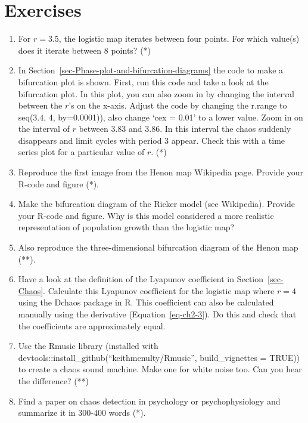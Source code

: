 \documentclass[
  a4paper,
  DIV=11,
  numbers=noendperiod,
  oneside]{scrreprt}
\begin{document}
\hypertarget{sec-Exercises}{%
\section{Exercises}\label{sec-Exercises}}

\begin{enumerate}
\def\labelenumi{\arabic{enumi})}
\item
  For \(r=3.5\), the logistic map iterates between four points. For
  which value(s) does it iterate between 8 points? (*)
\item
  In Section~\ref{sec-Phase-plot-and-bifurcation-diagrams} the code to
  make a bifurcation plot is shown. First, run this code and take a look
  at the bifurcation plot. In this plot, you can also zoom in by
  changing the interval between the \(r\)'s on the x-axis. Adjust the
  code by changing the r.range to seq(3.4, 4, by=0.0001)), also change
  `cex = 0.01' to a lower value. Zoom in on the interval of \(r\)
  between 3.83 and 3.86. In this interval the chaos suddenly disappears
  and limit cycles with period 3 appear. Check this with a time series
  plot for a particular value of \(r\). (*)
\item
  Reproduce the first image from the Henon map Wikipedia page. Provide
  your R-code and figure (*).
\item
  Make the bifurcation diagram of the Ricker model (see Wikipedia).
  Provide your R-code and figure. Why is this model considered a more
  realistic representation of population growth than the logistic map?
\item
  Also reproduce the three-dimensional bifurcation diagram of the Henon
  map (**).
\item
  Have a look at the definition of the Lyapunov coefficient in
  Section~\ref{sec-Chaos}. Calculate this Lyapunov coefficient for the
  logistic map where \(r = 4\) using the Dchaos package in R. This
  coefficient can also be calculated manually using the derivative
  (Equation~\ref{eq-ch2-3}). Do this and check that the coefficients are
  approximately equal.
\item
  Use the Rmusic library (installed with
  devtools::install\_github(``keithmcnulty/Rmusic'', build\_vignettes =
  TRUE)) to create a chaos sound machine. Make one for white noise too.
  Can you hear the difference? (**)
\item
  Find a paper on chaos detection in psychology or psychophysiology and
  summarize it in 300-400 words (*).
\end{enumerate}
\end{document}
